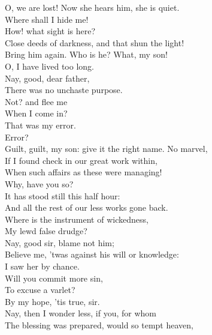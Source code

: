 \documentclass[a4paper,oneside]{memoir}
\begin{document}
\begin{drama*}
\facespeaks {} O, we are lost! Now she hears him, she is quiet.\\
\mammonspeaks Where shall I hide me!\\
\subtlespeaks {} How! what sight is here?\\
Close deeds of darkness, and that shun the light!\\
Bring him again. Who is he? What, my son!\\
O, I have lived too long.\\
\mammonspeaks {} Nay, good, dear father,\\
There was no unchaste purpose.\\
\subtlespeaks {} Not? and flee me\\
When I come in?\\
\mammonspeaks {} That was my error.\\
\subtlespeaks {} Error?\\
Guilt, guilt, my son: give it the right name. No marvel,\\
If I found check in our great work within,\\
When such affairs as these were managing!\\
\mammonspeaks Why, have you so?\\
\subtlespeaks {} It has stood still this half hour:\\
And all the rest of our less works gone back.\\
Where is the instrument of wickedness,\\
My lewd false drudge?\\
\mammonspeaks {} Nay, good sir, blame not him;\\
Believe me, 'twas against his will or knowledge:\\
I saw her by chance.\\
\subtlespeaks {} Will you commit more sin,\\
To excuse a varlet?\\
\mammonspeaks {} By my hope, 'tis true, sir.\\
\subtlespeaks Nay, then I wonder less, if you, for whom\\
The blessing was prepared, would so tempt heaven,\\

\end{drama*}
\end{document}
